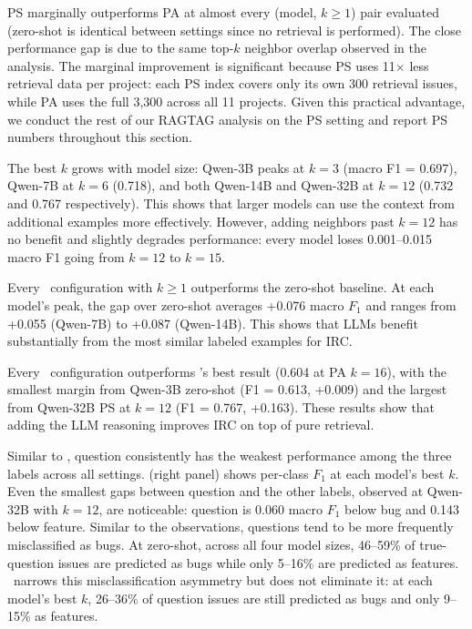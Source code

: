 PS marginally outperforms PA at almost every (model, $k{\ge}1$) pair evaluated (zero-shot is identical between settings since no retrieval is performed). The close performance gap is due to the same top-$k$ neighbor overlap observed in the \votag analysis. The marginal improvement is significant because PS uses 11$\times$ less retrieval data per project: each PS index covers only its own 300 retrieval issues, while PA uses the full 3{,}300 across all 11 projects. Given this practical advantage, we conduct the rest of our RAGTAG analysis on the PS setting and report PS numbers throughout this section.

The best $k$ grows with model size: Qwen-3B peaks at $k{=}3$ (macro F1 = 0.697), Qwen-7B at $k{=}6$ (0.718), and both Qwen-14B and Qwen-32B at $k{=}12$ (0.732 and 0.767 respectively). This shows that larger models can use the context from additional examples more effectively. However, adding neighbors past $k{=}12$ has no benefit and slightly degrades performance: every model loses 0.001--0.015 macro F1 going from $k{=}12$ to $k{=}15$.

Every \ragtag\ configuration with $k{\ge}1$ outperforms the zero-shot baseline. At each model's peak, the gap over zero-shot averages +0.076 macro $F_1$ and ranges from +0.055 (Qwen-7B) to +0.087 (Qwen-14B). This shows that LLMs benefit substantially from the most similar labeled examples for IRC.

Every \ragtag\ configuration outperforms \votag's best result (0.604 at PA $k{=}16$), with the smallest margin from Qwen-3B zero-shot (F1 = 0.613, +0.009) and the largest from Qwen-32B PS at $k{=}12$ (F1 = 0.767, +0.163). These results show that adding the LLM reasoning improves IRC on top of pure retrieval.

Similar to \votag, question consistently has the weakest performance among the three labels across all \ragtag settings.  (right panel) shows per-class $F_1$ at each model's best $k$. Even the smallest gaps between question and the other labels, observed at Qwen-32B with $k{=}12$, are noticeable: question is 0.060 macro $F_1$ below bug and 0.143 below feature. Similar to the \votag observations, questions tend to be more frequently misclassified as bugs. At zero-shot, across all four model sizes, 46--59\% of true-question issues are predicted as bugs while only 5--16\% are predicted as features. \ragtag\ narrows this misclassification asymmetry but does not eliminate it: at each model's best $k$, 26--36\% of question issues are still predicted as bugs and only 9--15\% as features. 

